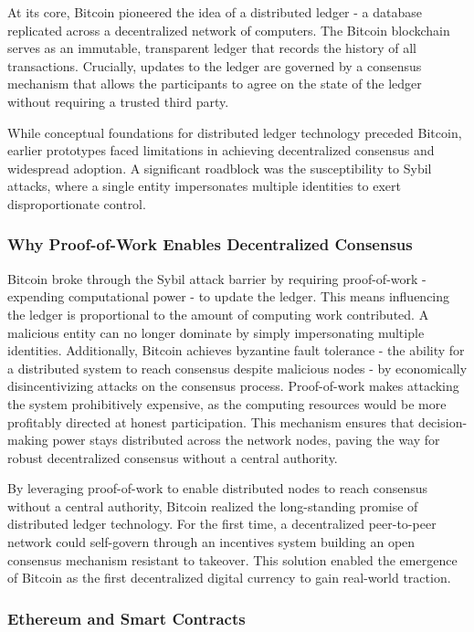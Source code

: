 \documentclass[11pt]{report}
\begin{document}
At its core, Bitcoin pioneered the idea of a distributed ledger - a database replicated across a decentralized network of computers. The Bitcoin blockchain serves as an immutable, transparent ledger that records the history of all transactions. Crucially, updates to the ledger are governed by a consensus mechanism that allows the participants to agree on the state of the ledger without requiring a trusted third party.

While conceptual foundations for distributed ledger technology preceded Bitcoin, earlier prototypes faced limitations in achieving decentralized consensus and widespread adoption. A significant roadblock was the susceptibility to Sybil attacks, where a single entity impersonates multiple identities to exert disproportionate control.

\subsubsection{Why Proof-of-Work Enables Decentralized Consensus}

Bitcoin broke through the Sybil attack barrier by requiring proof-of-work - expending computational power - to update the ledger. This means influencing the ledger is proportional to the amount of computing work contributed. A malicious entity can no longer dominate by simply impersonating multiple identities. Additionally, Bitcoin achieves byzantine fault tolerance - the ability for a distributed system to reach consensus despite malicious nodes - by economically disincentivizing attacks on the consensus process. Proof-of-work makes attacking the system prohibitively expensive, as the computing resources would be more profitably directed at honest participation. This mechanism ensures that decision-making power stays distributed across the network nodes, paving the way for robust decentralized consensus without a central authority.

By leveraging proof-of-work to enable distributed nodes to reach consensus without a central authority, Bitcoin realized the long-standing promise of distributed ledger technology. For the first time, a decentralized peer-to-peer network could self-govern through an incentives system building an open consensus mechanism resistant to takeover. This solution enabled the emergence of Bitcoin as the first decentralized digital currency to gain real-world traction.

\subsubsection{Ethereum and Smart Contracts}
\end{document}
